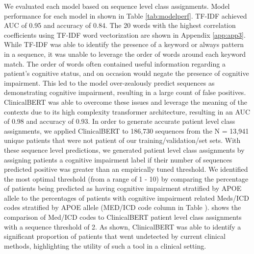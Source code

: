 \documentclass[pmlr,twocolumn,10pt]{jmlr} %
\begin{document}

We evaluated each model based on sequence level class assignments. Model performance for each model in shown in Table \ref{tab:modelperf}. TF-IDF achieved AUC of 0.95 and accuracy of 0.84. The 20 words with the highest correlation coefficients using TF-IDF word vectorization are shown in Appendix \ref{app:app3}. While TF-IDF was able to identify the presence of a keyword or always pattern in a sequence, it was unable to leverage the order of words around each keyword match. The order of words often contained useful information regarding a patient's cognitive status, and on occasion would negate the presence of cognitive impairment. This led to the model over-zealously predict sequences as demonstrating cognitive impairment, resulting in a large count of false positives. ClinicalBERT was able to overcome these issues and leverage the meaning of the contexts due to its high complexity transformer architecture, resulting in an AUC of 0.98 and accuracy of 0.93. In order to generate accurate patient level class assignments, we applied ClinicalBERT to 186,730 sequences from the N = 13,941 unique patients that were not patient of our training/validation/set sets. With these sequence level predictions, we generated patient level class assignments by assigning patients a cognitive impairment label if their number of sequences predicted positive was greater than an empirically tuned threshold. We identified the most optimal threshold (from a range of 1 - 10) by comparing the percentage of patients being predicted as having cognitive impairment stratified by APOE allele to the percentages of patients with cognitive impairment related Meds/ICD codes stratified by APOE allele (MED/ICD code column in Table ).  shows the comparison of Med/ICD codes to ClinicalBERT patient level class assignments with a sequence threshold of 2. As shown, ClinicalBERT was able to identify a significant proportion of patients that went undetected by current clinical methods, highlighting the utility of such a tool in a clinical setting. 

\end{document}

